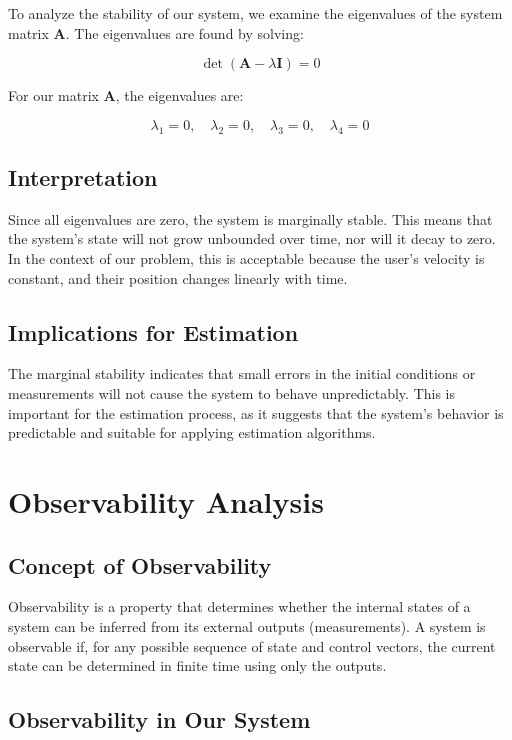 \documentclass[12pt]{article}
\begin{document}
To analyze the stability of our system, we examine the eigenvalues of the system matrix \( \mathbf{A} \). The eigenvalues are found by solving:

\[
\det(\mathbf{A} - \lambda \mathbf{I}) = 0
\]

For our matrix \( \mathbf{A} \), the eigenvalues are:

\[
\lambda_1 = 0, \quad \lambda_2 = 0, \quad \lambda_3 = 0, \quad \lambda_4 = 0
\]

\subsection{Interpretation}

Since all eigenvalues are zero, the system is marginally stable. This means that the system's state will not grow unbounded over time, nor will it decay to zero. In the context of our problem, this is acceptable because the user's velocity is constant, and their position changes linearly with time.

\subsection{Implications for Estimation}

The marginal stability indicates that small errors in the initial conditions or measurements will not cause the system to behave unpredictably. This is important for the estimation process, as it suggests that the system's behavior is predictable and suitable for applying estimation algorithms.

\section{Observability Analysis}

\subsection{Concept of Observability}

Observability is a property that determines whether the internal states of a system can be inferred from its external outputs (measurements). A system is observable if, for any possible sequence of state and control vectors, the current state can be determined in finite time using only the outputs.

\subsection{Observability in Our System}
\end{document}
